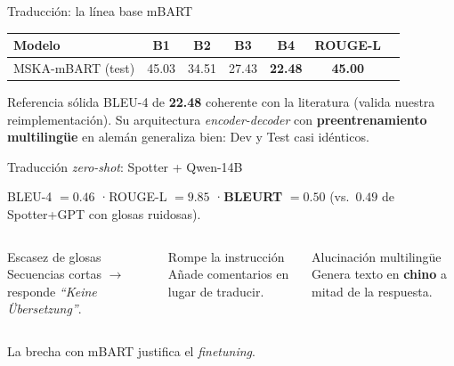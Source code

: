 \documentclass[aspectratio=169,xcolor=dvipsnames]{beamer}
\begin{document}

\begin{frame}{Traducción: la línea base mBART}
    \begin{center}
        \begin{tabular}{lcccccc}
            \toprule
            \textbf{Modelo} & \textbf{B1} & \textbf{B2} & \textbf{B3} & \textbf{B4} & \textbf{ROUGE-L} \\
            \midrule
            MSKA-mBART (test) & 45.03 & 34.51 & 27.43 & \textbf{22.48} & \textbf{45.00} \\
            \bottomrule
        \end{tabular}
    \end{center}
    \vspace{0.4em}
    \begin{block}{Referencia sólida}
        BLEU-4 de \textbf{22.48} coherente con la literatura (valida nuestra reimplementación).
        Su arquitectura \textit{encoder-decoder} con \textbf{preentrenamiento multilingüe} en alemán
        generaliza bien: Dev y Test casi idénticos.
    \end{block}
\end{frame}


\begin{frame}{Traducción \textit{zero-shot}: Spotter + Qwen-14B}
    \begin{center}
        \small BLEU-4 $=0.46$ \quad·\quad ROUGE-L $=9.85$ \quad·\quad \textbf{BLEURT} $=0.50$
        (vs.\ $0.49$ de Spotter+GPT con glosas ruidosas).
    \end{center}
    \begin{columns}[T]
        \begin{alertblock}{Escasez de glosas}
            \footnotesize Secuencias cortas $\rightarrow$ responde \textit{``Keine Übersetzung''}.
        \end{alertblock}
        \begin{alertblock}{Rompe la instrucción}
            \footnotesize Añade comentarios en lugar de traducir.
        \end{alertblock}
        \begin{alertblock}{Alucinación multilingüe}
            \footnotesize Genera texto en \textbf{chino} a mitad de la respuesta.
        \end{alertblock}
    \end{columns}
    \begin{center}
        \small La brecha con mBART justifica el \alert{\textit{finetuning}}.
    \end{center}
\end{frame}
\end{document}
